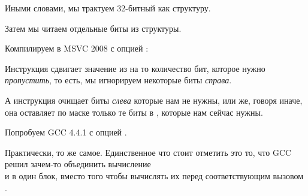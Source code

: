 Иными словами, мы трактуем 32-битный \Tint как структуру.

Затем мы читаем отдельные биты из структуры.


Компилируем в MSVC 2008 с опцией \Ox:



Инструкция  сдвигает значение из \EAX на то количество бит, 
которое нужно \emph{пропустить}, то есть, мы игнорируем некоторые биты \emph{справа}.

А инструкция \AND очищает биты \emph{слева} которые нам не нужны, или же, говоря иначе, 
она оставляет по маске только те биты в \EAX, которые нам сейчас нужны.




Попробуем GCC 4.4.1 с опцией \Othree.



Практически, то же самое. Единственное что стоит отметить это то, что GCC решил зачем-то объединить 
вычисление \\
 и  в один блок, 
вместо того чтобы вычислять их перед соответствующим вызовом \printf.

